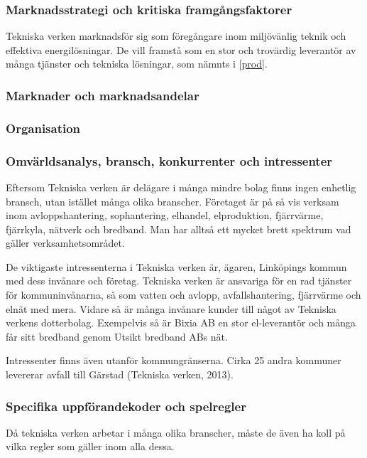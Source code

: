 \documentclass[10pt,a4paper]{article}
\begin{document}
\subsubsection{Marknadsstrategi och kritiska framgångsfaktorer}
Tekniska verken marknadsför sig som föregångare inom miljövänlig teknik och
effektiva energilösningar. De vill framstå som en stor och trovärdig leverantör 
av många tjänster och tekniska lösningar, som nämnts i \ref{prod}. 


\subsubsection{Marknader och marknadsandelar}

\subsubsection{Organisation}

\subsubsection{Omvärldsanalys, bransch, konkurrenter och intressenter}

Eftersom Tekniska verken är delägare i många mindre bolag finns ingen enhetlig 
bransch, utan istället många olika branscher. Företaget är på så vis verksam inom
avloppshantering, sophantering, elhandel, elproduktion, fjärrvärme, fjärrkyla, 
nätverk och bredband. Man har alltså ett mycket brett spektrum vad gäller 
verksamhetsområdet.


De viktigaste intressenterna i Tekniska verken är, ägaren, Linköpings kommun
med dess invånare och företag. Tekniska verken är ansvariga för en rad tjänster
för kommuninvånarna, så som vatten och avlopp, avfallshantering, fjärrvärme och
elnät med mera. Vidare så är många invånare kunder till något av Tekniska
verkens dotterbolag. Exempelvis så är Bixia AB en stor el-leverantör och många
får sitt bredband genom Utsikt bredband ABs nät.

Intressenter finns även utanför kommungränserna. Cirka 25 andra kommuner
levererar avfall till Gärstad (Tekniska verken, 2013).

\subsubsection{Specifika uppförandekoder och spelregler}
Då tekniska verken arbetar i många olika branscher, måste de även ha koll på
vilka regler som gäller inom alla dessa. \\
\end{document}
